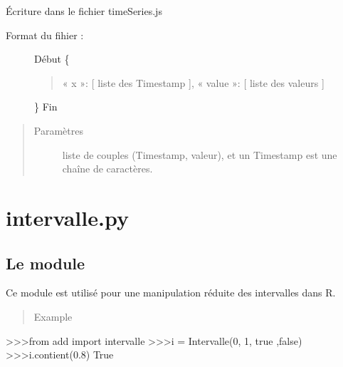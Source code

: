 \documentclass[letterpaper,10pt,openany,oneside,french]{sphinxmanual}
\begin{document}
\begin{fulllineitems}
\label{\detokenize{addQuantitativesDiscretes:add.addQuantitativesDiscretes.infoSerieTemporelle}}
Écriture dans le fichier timeSeries.js
\begin{description}
\item[{Format du fihier :}] \leavevmode
Début
\{
\begin{quote}

« x »: {[} liste des Timestamp {]},
« value »: {[} liste des valeurs {]}
\end{quote}

\}
Fin

\end{description}
\begin{quote}\begin{description}
\item[{Paramètres}] \leavevmode
{} \textendash{} liste de couples (Timestamp, valeur), et un Timestamp est une chaîne de caractères.

\end{description}\end{quote}

\end{fulllineitems}



\chapter{intervalle.py}
\label{\detokenize{intervalle:module-add.intervalle}}\label{\detokenize{intervalle::doc}}\label{\detokenize{intervalle:intervalle-py}}

\section{Le module }
\label{\detokenize{intervalle:le-module-intervalle}}
Ce module est utilisé pour une manipulation réduite des intervalles dans R.
\begin{quote}\begin{description}
\item[{Example}] \leavevmode
\end{description}\end{quote}

\textgreater{}\textgreater{}\textgreater{}from add import intervalle
\textgreater{}\textgreater{}\textgreater{}i = Intervalle(0, 1, true ,false)
\textgreater{}\textgreater{}\textgreater{}i.contient(0.8)
True
\end{document}
